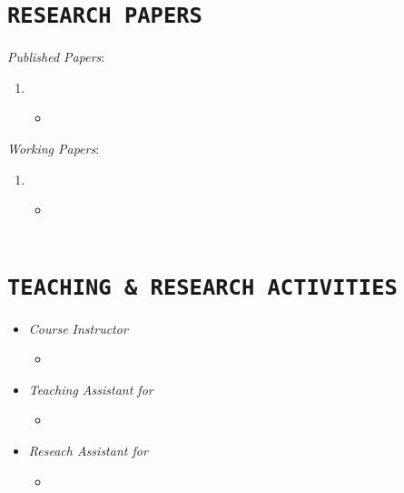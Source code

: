 \documentclass{sty/CV_Class}
\begin{document}
\section{\texttt{RESEARCH PAPERS}}
\textit{Published Papers}:
	\begin{enumerate}
		\item {}
		\begin{itemize}
			\item[] \\
		\end{itemize} 
	\end{enumerate}
\textit{Working Papers}:
	\begin{enumerate}
		\item {}
		\begin{itemize}
			\item[] \\~\\
		\end{itemize}  
	\end{enumerate}


\section{\texttt{TEACHING \& RESEARCH ACTIVITIES}}
\begin{itemize}
	\item \textit{Course Instructor}
	\begin{itemize}
		\item[] 
	\end{itemize}
	\item \textit{Teaching Assistant for}
	\begin{itemize}
		\item[] 
	\end{itemize}
	\item \textit{Reseach Assistant for}
	\begin{itemize}
		\item[] \\~\\
	\end{itemize}
\end{itemize}
\end{document}
